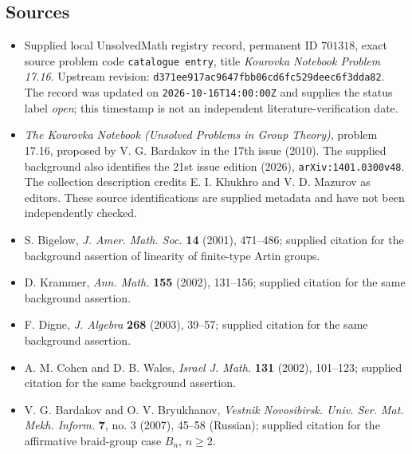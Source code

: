 \documentclass[11pt]{article}
\begin{document}
\subsection{Sources}
\begin{itemize}
\item Supplied local UnsolvedMath registry record, permanent ID \(701318\), exact source problem code \texttt{catalogue entry}, title \emph{Kourovka Notebook Problem 17.16}. Upstream revision: \texttt{d371ee917ac9647fbb06cd6fc529deec6f3dda82}. The record was updated on \texttt{2026-10-16T14:00:00Z} and supplies the status label \emph{open}; this timestamp is not an independent literature-verification date.
\item \emph{The Kourovka Notebook (Unsolved Problems in Group Theory)}, problem 17.16, proposed by V. G. Bardakov in the 17th issue (2010). The supplied background also identifies the 21st issue edition (2026), \texttt{arXiv:1401.0300v48}. The collection description credits E. I. Khukhro and V. D. Mazurov as editors. These source identifications are supplied metadata and have not been independently checked.
\item S. Bigelow, \emph{J. Amer. Math. Soc.} \textbf{14} (2001), 471--486; supplied citation for the background assertion of linearity of finite-type Artin groups.
\item D. Krammer, \emph{Ann. Math.} \textbf{155} (2002), 131--156; supplied citation for the same background assertion.
\item F. Digne, \emph{J. Algebra} \textbf{268} (2003), 39--57; supplied citation for the same background assertion.
\item A. M. Cohen and D. B. Wales, \emph{Israel J. Math.} \textbf{131} (2002), 101--123; supplied citation for the same background assertion.
\item V. G. Bardakov and O. V. Bryukhanov, \emph{Vestnik Novosibirsk. Univ. Ser. Mat. Mekh. Inform.} \textbf{7}, no. 3 (2007), 45--58 (Russian); supplied citation for the affirmative braid-group case \(B_n\), \(n\geq2\).
\end{itemize}
\end{document}
